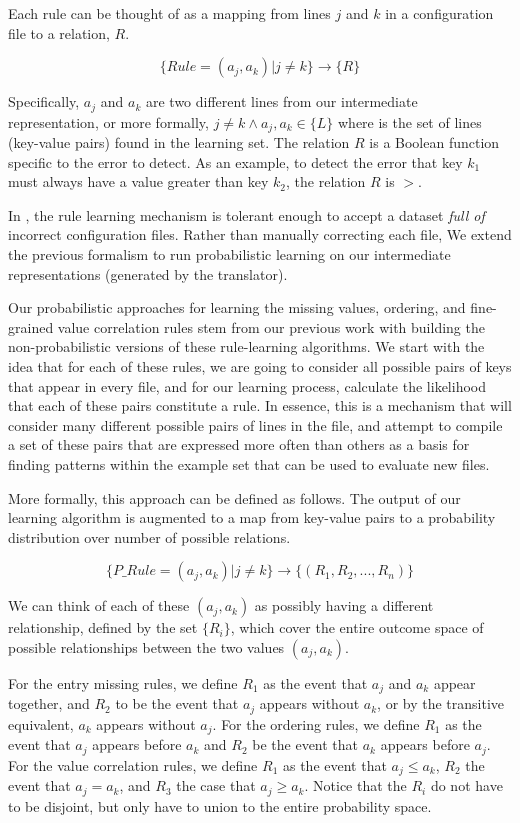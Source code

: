 Each rule can be thought of as a mapping from 
lines $j$ and $k$ in a configuration file to a relation, $R$.

\[
\{ Rule = (a_j, a_k) | j \neq k \} \rightarrow \{ R \}
\]

Specifically, $a_j$ and $a_k$ are two different lines from our
intermediate representation, or more formally, $j \neq k \land
a_j, a_k \in \{ L \}$ where is the set of lines (key-value pairs) found
in the learning set. The relation $R$
is a Boolean function specific to the error to detect. 
As an example, to detect the error that key $k_1$ must always 
have a value greater than key $k_2$, the relation $R$ is $>$.

In \app, the rule learning mechanism is tolerant 
enough to accept a dataset {\em full of} incorrect configuration files.
Rather than manually correcting each file, 
We extend the previous formalism to run probabilistic learning
on our intermediate representations (generated by the translator). 

Our probabilistic approaches for learning the missing values, 
ordering, and fine-grained value correlation rules stem 
from our previous work with building 
the non-probabilistic versions of these rule-learning algorithms. 
We start with the idea that for each of these rules, 
we are going to consider all possible pairs of keys that appear in every 
file, and for our learning process, calculate the likelihood that each of 
these pairs constitute a rule. 
In essence, this is a mechanism that will consider many different possible 
pairs of lines in the file, 
and attempt to compile a set of these pairs 
that are expressed more often than others as a basis for finding patterns 
within the example set that can be used to evaluate new files.

More formally, this approach can be defined as follows. 
The output of our learning algorithm is augmented to a map from 
key-value pairs to a probability distribution over number of possible 
relations.

\[
\{ P\_Rule = (a_j, a_k) | j \neq k \} \rightarrow \{ (R_1, R_2, ... , R_n) \}
\]

We can think of each of these $(a_j, a_k)$ as possibly having a different relationship, defined by the set $\{ R_i \}$, which cover the entire outcome space of possible relationships between the two values $(a_j, a_k)$.

For the entry missing rules, we define $R_1$ as the event that $a_j$ and
$a_k$ appear together, and $R_2$ to be the event that $a_j$ appears
without $a_k$, or by the transitive equivalent, $a_k$ appears without
$a_j$. For the ordering rules, we define $R_1$ as the event that
$a_j$ appears before $a_k$ and $R_2$ be the event that $a_k$ appears
before $a_j$. For the value correlation rules, we define $R_1$ as the
event that $a_j \leq a_k$, $R_2$ the event that $a_j = a_k$, and $R_3$
the case that $a_j \geq a_k$. Notice that the $R_i$ do not have to be
disjoint, but only have to union to the entire probability space.

